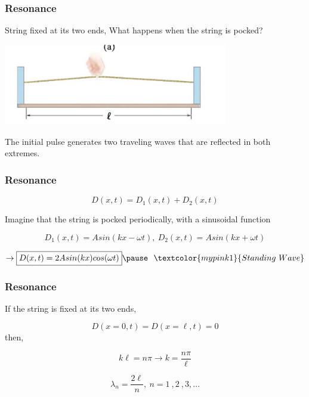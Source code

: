 \documentclass[]{beamer}
\begin{document}
\begin{frame}
\frametitle{Resonance}

String fixed at its two ends, \pause What happens when the string is pocked?


  \begin{center}
  \includegraphics[height=1.4in]{images4/19.jpg}
\end{center}

\pause

The initial pulse generates two traveling waves that are  reflected in both extremes. 
  \end{frame}



\begin{frame}
\frametitle{Resonance}



\begin{equation*}
D(x,t)=D_1(x,t)+D_2(x,t)
\end{equation*}

\pause

Imagine that the string is pocked periodically, with a sinusoidal function
\pause


\begin{equation*}
D_1(x,t)=Asin(kx-\omega t),~D_2(x,t)=Asin(kx+\omega t)
\end{equation*}


\begin{equation}
\rightarrow \boxed{D(x,t)=2Asin(kx)cos(\omega t)} \pause ~~\textcolor{mypink1}{Standing~Wave}
\end{equation}


  \end{frame}





\begin{frame}
\frametitle{Resonance}

If the string is fixed at its two ends,

\begin{equation*}
D(x=0,t)=D(x=\ell,t)=0
\end{equation*}
then,

\begin{equation}
 k\ell=n\pi \rightarrow k=\frac{ n\pi}{\ell}
\end{equation}

\begin{equation}
  \lambda_n=\frac{2\ell}{n},~n=1~,2~,3,...
  \end{equation}

\end{frame}
\end{document}
